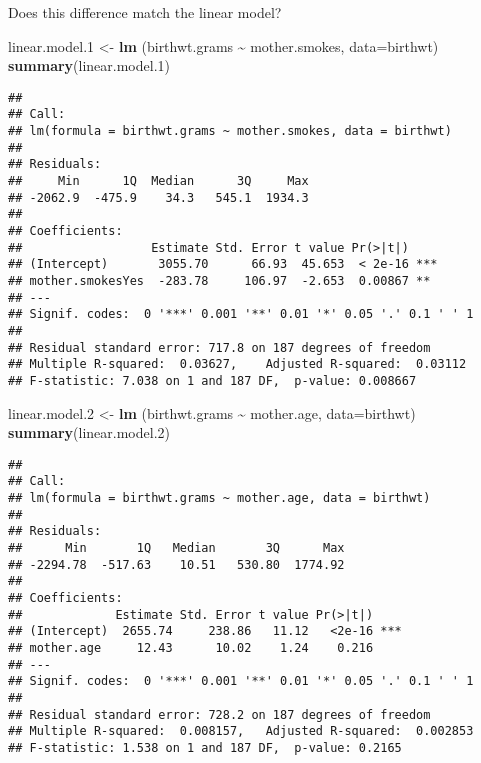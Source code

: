 \documentclass[
]{article}
\newenvironment{Shaded}{\begin{snugshade}}{\end{snugshade}}
\newcommand{\AttributeTok}[1]{\textcolor[rgb]{0.13,0.29,0.53}{#1}}
\newcommand{\FloatTok}[1]{\textcolor[rgb]{0.00,0.00,0.81}{#1}}
\newcommand{\FunctionTok}[1]{\textcolor[rgb]{0.13,0.29,0.53}{\textbf{#1}}}
\newcommand{\NormalTok}[1]{#1}
\newcommand{\OtherTok}[1]{\textcolor[rgb]{0.56,0.35,0.01}{#1}}
\newcommand{\SpecialCharTok}[1]{\textcolor[rgb]{0.81,0.36,0.00}{\textbf{#1}}}
\begin{document}
Does this difference match the linear model?

\begin{Shaded}
\begin{Highlighting}[]
\NormalTok{linear.model}\FloatTok{.1} \OtherTok{\textless{}{-}} \FunctionTok{lm}\NormalTok{ (birthwt.grams }\SpecialCharTok{\textasciitilde{}}\NormalTok{ mother.smokes, }\AttributeTok{data=}\NormalTok{birthwt)}
\FunctionTok{summary}\NormalTok{(linear.model}\FloatTok{.1}\NormalTok{)}
\end{Highlighting}
\end{Shaded}

\begin{verbatim}
## 
## Call:
## lm(formula = birthwt.grams ~ mother.smokes, data = birthwt)
## 
## Residuals:
##     Min      1Q  Median      3Q     Max 
## -2062.9  -475.9    34.3   545.1  1934.3 
## 
## Coefficients:
##                  Estimate Std. Error t value Pr(>|t|)    
## (Intercept)       3055.70      66.93  45.653  < 2e-16 ***
## mother.smokesYes  -283.78     106.97  -2.653  0.00867 ** 
## ---
## Signif. codes:  0 '***' 0.001 '**' 0.01 '*' 0.05 '.' 0.1 ' ' 1
## 
## Residual standard error: 717.8 on 187 degrees of freedom
## Multiple R-squared:  0.03627,    Adjusted R-squared:  0.03112 
## F-statistic: 7.038 on 1 and 187 DF,  p-value: 0.008667
\end{verbatim}

\begin{Shaded}
\begin{Highlighting}[]
\NormalTok{linear.model}\FloatTok{.2} \OtherTok{\textless{}{-}} \FunctionTok{lm}\NormalTok{ (birthwt.grams }\SpecialCharTok{\textasciitilde{}}\NormalTok{ mother.age, }\AttributeTok{data=}\NormalTok{birthwt)}
\FunctionTok{summary}\NormalTok{(linear.model}\FloatTok{.2}\NormalTok{)}
\end{Highlighting}
\end{Shaded}

\begin{verbatim}
## 
## Call:
## lm(formula = birthwt.grams ~ mother.age, data = birthwt)
## 
## Residuals:
##      Min       1Q   Median       3Q      Max 
## -2294.78  -517.63    10.51   530.80  1774.92 
## 
## Coefficients:
##             Estimate Std. Error t value Pr(>|t|)    
## (Intercept)  2655.74     238.86   11.12   <2e-16 ***
## mother.age     12.43      10.02    1.24    0.216    
## ---
## Signif. codes:  0 '***' 0.001 '**' 0.01 '*' 0.05 '.' 0.1 ' ' 1
## 
## Residual standard error: 728.2 on 187 degrees of freedom
## Multiple R-squared:  0.008157,   Adjusted R-squared:  0.002853 
## F-statistic: 1.538 on 1 and 187 DF,  p-value: 0.2165
\end{verbatim}
\end{document}
